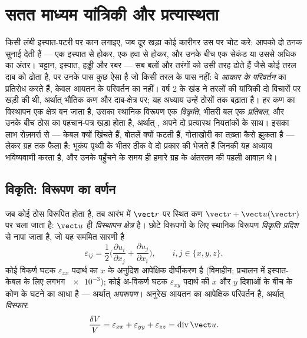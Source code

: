 \chapter{सतत माध्यम यांत्रिकी और प्रत्यास्थता}\label{ch:b3:continuum-elasticity}

किसी लंबी इस्पात-पटरी पर कान लगाइए, जब दूर खड़ा कोई कारीगर उस पर चोट
करे: आपको दो ठनक सुनाई देती हैं --- एक इस्पात से होकर, एक हवा से होकर,
और उनके बीच एक सेकंड या उससे अधिक का अंतर। चट्टान, इस्पात, हड्डी और
रबर --- सब बलों और तरंगों को उसी तरह ढोते हैं जैसे कोई तरल दाब को ढोता
है, पर उनके पास कुछ ऐसा है जो किसी तरल के पास नहीं: वे \emph{आकार के
परिवर्तन} का प्रतिरोध करते हैं, केवल आयतन के परिवर्तन का नहीं। वर्ष 2
के खंड ने तरलों की यांत्रिकी दो विचारों पर खड़ी की थी, अर्थात्
भौतिक कण और दाब-क्षेत्र पर; यह अध्याय उन्हें ठोसों तक बढ़ाता है। हर कण
का विस्थापन एक क्षेत्र बन जाता है, उसका स्थानिक विरूपण एक
\emph{विकृति}, भीतरी बल एक \emph{प्रतिबल}, और उनके बीच ठोस का पहचान-पत्र
खड़ा होता है, अर्थात् , अपने दो
प्रत्यास्थ नियतांकों के साथ। इसका लाभ रोज़मर्रा से --- केबल क्यों खिंचते
हैं, बोतलें क्यों फटती हैं, गोताखोरी का तख़्ता कैसे झुकता है --- लेकर
ग्रह तक फैला है: भूकंप पृथ्वी के भीतर ठीक वे दो प्रकार की  भेजते हैं जिनकी यह अध्याय भविष्यवाणी करता है, और उनके पहुँचने के
समय ही हमारे ग्रह के अंतरतम की पहली आवाज़ थे।

\section{विकृति: विरूपण का वर्णन}

\begin{definition}[विस्थापन क्षेत्र और विकृति प्रदिश]\label{def:b3:continuum-elasticity:strain}
जब कोई ठोस विरूपित होता है, तब आरंभ में $\vect r$ पर स्थित कण
$\vect r + \vect u(\vect r)$ पर चला जाता है: $\vect u$ ही
\emph{विस्थापन क्षेत्र} है। छोटे विरूपणों के लिए स्थानिक विरूपण
\emph{विकृति प्रदिश} से नापा जाता है, जो यह सममित सारणी है
\[
\varepsilon_{ij} = \frac12\Big(
 \frac{\partial u_i}{\partial x_j} + \frac{\partial u_j}{\partial x_i}
\Big) , \qquad i, j \in \{x, y, z\} .
\]
कोई विकर्ण घटक $\varepsilon_{xx}$ पदार्थ का $x$ के अनुदिश आपेक्षिक
दीर्घीकरण है (विमाहीन; प्रचालन में इस्पात-केबल के लिए लगभग
$\num{e-3}$); कोई अ-विकर्ण घटक $\varepsilon_{xy}$ पदार्थ की
$x$ और $y$ दिशाओं के बीच के कोण के घटने का आधा है
--- अर्थात् \emph{अपरूपण}। अनुरेख आयतन का आपेक्षिक परिवर्तन है, अर्थात्
\emph{विस्फार}:
\[
\frac{\delta V}{V} = \varepsilon_{xx} + \varepsilon_{yy} +
\varepsilon_{zz} = \operatorname{div}\vect u .
\]
\end{definition}

